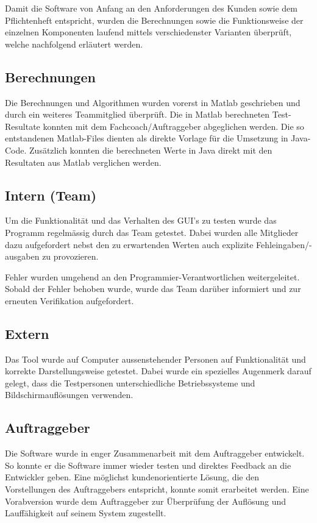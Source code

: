 Damit  die Software  von  Anfang an  den Anforderungen  des  Kunden sowie  dem
Pflichtenheft entspricht, wurden die Berechnungen sowie die Funktionsweise der
einzelnen Komponenten laufend mittels verschiedenster Varianten \"uberpr\"uft,
welche nachfolgend erl\"autert werden.

\subsection{Berechnungen}
Die  Berechnungen und  Algorithmen wurden  vorerst in  Matlab geschrieben  und
durch  ein  weiteres  Teammitglied \"uberpr\"uft. Die  in  Matlab  berechneten
Test-Resultate konnten mit  dem Fachcoach/Auftraggeber abgeglichen werden. Die
so entstandenen Matlab-Files  dienten als direkte Vorlage  f\"ur die Umsetzung
in Java-Code. Zus\"atzlich  konnten die berechneten  Werte in Java  direkt mit
den Resultaten aus Matlab verglichen werden.

\subsection{Intern (Team)}
Um  die  Funktionalit\"at  und  das   Verhalten  des  GUI’s  zu  testen  wurde
das  Programm  regelm\"assig  durch   das  Team  getestet. Dabei  wurden  alle
Mitglieder dazu  aufgefordert nebst den  zu erwartenden Werten  auch explizite
Fehleingaben/-ausgaben zu provozieren.

Fehler     wurden     umgehend     an     den     Programmier-Verantwortlichen
weitergeleitet. Sobald  der Fehler  behoben  wurde, wurde  das Team  dar\"uber
informiert und zur erneuten Verifikation aufgefordert.

\subsection{Extern}
Das Tool wurde auf Computer  aussenstehender Personen auf Funktionalit\"at und
korrekte  Darstellungsweise  getestet. Dabei  wurde ein  spezielles  Augenmerk
darauf  gelegt, dass  die  Testpersonen  unterschiedliche Betriebssysteme  und
Bildschirmaufl\"osungen verwenden.


\subsection{Auftraggeber}
Die Software wurde in enger Zusammenarbeit mit dem Auftraggeber entwickelt. So
konnte  er  die  Software  immer   wieder  testen  und  direktes  Feedback  an
die  Entwickler   geben. Eine  m\"oglichst  kundenorientierte   L\"osung,  die
den  Vorstellungen  des  Auftraggebers  entspricht,  konnte  somit  erarbeitet
werden. Eine  Vorabversion  wurde  dem Auftraggeber  zur  \"Uberpr\"ufung  der
Aufl\"osung und Lauff\"ahigkeit auf seinem System zugestellt.

